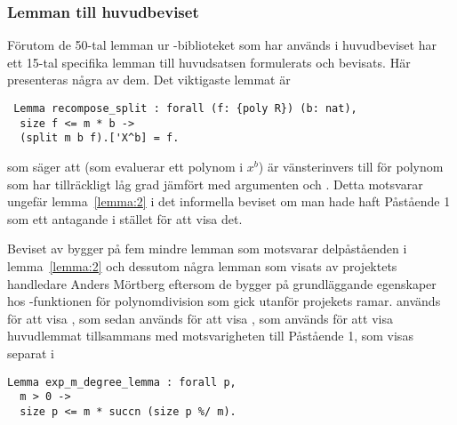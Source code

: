 \subsubsection{Lemman till huvudbeviset}
Förutom de 50-tal lemman ur \ssr{}-biblioteket som har används i huvudbeviset har
ett 15-tal specifika lemman till huvudsatsen formulerats och bevisats. Här
presenteras några av dem. Det viktigaste lemmat är
\begin{lstlisting}
 Lemma recompose_split : forall (f: {poly R}) (b: nat),
  size f <= m * b ->
  (split m b f).['X^b] = f.
\end{lstlisting}
som säger att  (som evaluerar ett polynom i $x^b$) är
vänsterinvers till  för polynom som har tillräckligt låg grad jämfört
med argumenten  och . Detta motsvarar ungefär lemma~\ref{lemma:2} i
det informella beviset om man hade haft Påstående 1 som ett antagande i stället
för att visa det.

Beviset av  bygger på fem mindre lemman som motsvarar
delpåståenden i lemma~\ref{lemma:2} och dessutom några lemman som visats av
projektets handledare Anders Mörtberg eftersom de bygger på grundläggande
egenskaper hos \ssr{}-funktionen  för polynomdivision som gick utanför
projekets ramar.
 används för att visa , som
sedan används för att visa , som används för att visa
huvudlemmat tillsammans med motsvarigheten till Påstående 1, som visas separat
i
\begin{lstlisting}
Lemma exp_m_degree_lemma : forall p,
  m > 0 ->
  size p <= m * succn (size p %/ m).
\end{lstlisting}

